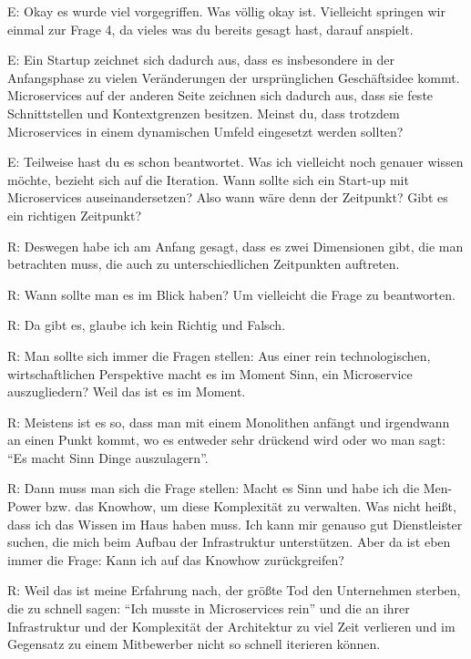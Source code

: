 E: Okay es wurde viel vorgegriffen. Was völlig okay ist. Vielleicht springen wir einmal zur Frage 4, da vieles was du bereits gesagt hast, darauf anspielt.

E: Ein Startup zeichnet sich dadurch aus, dass es insbesondere in der Anfangsphase zu vielen Veränderungen der ursprünglichen Geschäftsidee kommt. Microservices auf der anderen Seite zeichnen sich dadurch aus, dass sie feste Schnittstellen und Kontextgrenzen besitzen. Meinst du, dass trotzdem Microservices in einem dynamischen Umfeld eingesetzt werden sollten?

E: Teilweise hast du es schon beantwortet. Was ich vielleicht noch genauer wissen möchte, bezieht sich auf die Iteration. Wann sollte sich ein Start-up mit Microservices auseinandersetzen? Also wann wäre denn der Zeitpunkt? Gibt es ein richtigen Zeitpunkt? 

R: Deswegen habe ich am Anfang gesagt, dass es zwei Dimensionen gibt, die man betrachten muss, die auch zu unterschiedlichen Zeitpunkten auftreten.

R: Wann sollte man es im Blick haben? Um vielleicht die Frage zu beantworten.

\label{appendix:r-6}
R: Da gibt es, glaube ich kein Richtig und Falsch.

\label{appendix:r-7}
R: Man sollte sich immer die Fragen stellen: Aus einer rein technologischen, wirtschaftlichen Perspektive macht es im Moment Sinn, ein Microservice auszugliedern? Weil das ist es im Moment.

\label{appendix:r-8} \label{appendix:r-9}
R: Meistens ist es so, dass man mit einem Monolithen anfängt und irgendwann an einen Punkt kommt, wo es entweder sehr drückend wird oder wo man sagt: “Es macht Sinn Dinge auszulagern”.

\label{appendix:r-10}
R: Dann muss man sich die Frage stellen: Macht es Sinn und habe ich die Men-Power bzw. das Knowhow, um diese Komplexität zu verwalten. Was nicht heißt, dass ich das Wissen im Haus haben muss. Ich kann mir genauso gut Dienstleister suchen, die mich beim Aufbau der Infrastruktur unterstützen. Aber da ist eben immer die Frage: Kann ich auf das Knowhow zurückgreifen?

\label{appendix:r-11}
R: Weil das ist meine Erfahrung nach, der größte Tod den Unternehmen sterben, die zu schnell sagen: “Ich musste in Microservices rein” und die an ihrer Infrastruktur und der Komplexität der Architektur zu viel Zeit verlieren und im Gegensatz zu einem Mitbewerber nicht so schnell iterieren können. 

